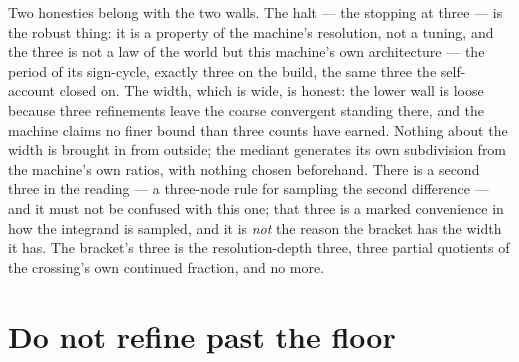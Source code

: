 Two honesties belong with the two walls.
The halt --- the stopping at three --- is the robust thing: it is a property of the machine's resolution, not a tuning,
and the three is not a law of the world but this machine's own architecture --- the period of its sign-cycle, exactly
three on the build, the same three the self-account closed on.
The width, which is wide, is honest: the lower wall is loose because three refinements leave the coarse convergent
standing there, and the machine claims no finer bound than three counts have earned.
Nothing about the width is brought in from outside; the mediant generates its own subdivision from the machine's own
ratios, with nothing chosen beforehand.
There is a second three in the reading --- a three-node rule for sampling the second difference --- and it must not be
confused with this one; that three is a marked convenience in how the integrand is sampled, and it is \emph{not} the
reason the bracket has the width it has.
The bracket's three is the resolution-depth three, three partial quotients of the crossing's own continued fraction, and
no more.

\section{Do not refine past the floor}

